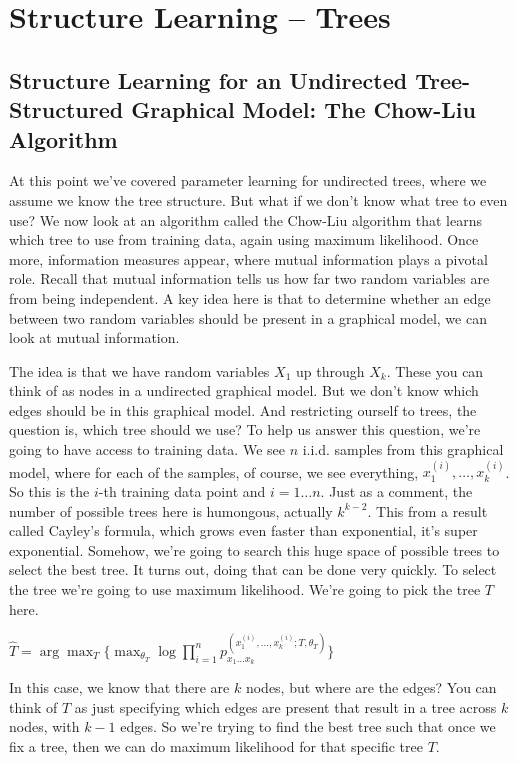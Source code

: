 
\graphicspath{ {images/slt/} }

\section{Structure Learning -- Trees}

\subsection{Structure Learning for an Undirected Tree-Structured Graphical Model: The Chow-Liu Algorithm}

At this point we've covered parameter learning for undirected trees, where we assume we know the tree structure. But what if we don't know what tree to even use? We now look at an algorithm called the Chow-Liu algorithm that learns which tree to use from training data, again using maximum likelihood. Once more, information measures appear, where mutual information plays a pivotal role. Recall that mutual information tells us how far two random variables are from being independent. A key idea here is that to determine whether an edge between two random variables should be present in a graphical model, we can look at mutual information.

The idea is that we have random variables $X_1$ up through $X_k$. These you can think of as nodes in a undirected graphical model. But we don't know which edges should be in this graphical model. And restricting ourself to trees, the question is, which tree should we use? To help us answer this question, we're going to have access to training data. We see $n$ i.i.d. samples from this graphical model, where for each of the samples, of course, we see everything, $x_1^{(i)},\dots ,x_k^{(i)}$. So this is the $i$-th training data point and $i = 1 \dots n$. Just as a comment, the number of possible trees here is humongous, actually $k^{k-2}$. This from a result called Cayley's formula, which grows even faster than exponential, it's super exponential. Somehow, we're going to search this huge space of possible trees to select the best tree. It turns out, doing that can be done very quickly. To select the tree we're going to use maximum likelihood. We're going to pick the tree $T$ here. 

{\centering$\displaystyle \widehat{T}=\arg\max_{T} \bigg\{\max_{\theta_T} \log \prod_{i=1}^n p_{x_1 \dots x_k}^{(x_1^{(i)},\dots ,x_k^{(i)}; T, \theta_T)} \bigg\}$ \par}

In this case, we know that there are $k$ nodes, but where are the edges? You can think of $T$ as just specifying which edges are present that result in a tree across $k$ nodes, with $k-1$ edges. So we're trying to find the best tree such that once we fix a tree, then we can do maximum likelihood for that specific tree $T$. 

